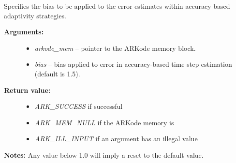 \documentclass[letterpaper,10pt,english]{sphinxmanual}
\begin{document}

\begin{fulllineitems}
\label{c_interface/User_callable:c.ARKodeSetErrorBias}
Specifies the bias to be applied to the error estimates within
accuracy-based adaptivity strategies.
\begin{description}
\item[{\textbf{Arguments:}}] \leavevmode\begin{itemize}
\item {} 
\emph{arkode\_mem} -- pointer to the ARKode memory block.

\item {} 
\emph{bias} -- bias applied to error in accuracy-based time
step estimation (default is 1.5).

\end{itemize}

\item[{\textbf{Return value:}}] \leavevmode\begin{itemize}
\item {} 
\emph{ARK\_SUCCESS} if successful

\item {} 
\emph{ARK\_MEM\_NULL} if the ARKode memory is 

\item {} 
\emph{ARK\_ILL\_INPUT} if an argument has an illegal value

\end{itemize}

\end{description}

\textbf{Notes:} Any value below 1.0 will imply a reset to the default value.

\end{fulllineitems}

\end{document}
